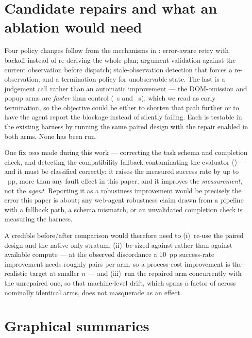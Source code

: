 \section{Candidate repairs and what an ablation would need}
\label{app:repair}

Four policy changes follow from the mechanisms in : error-aware
retry with backoff instead of re-deriving the whole plan; argument validation
against the current observation before dispatch; stale-observation detection that
forces a re-observation; and a termination policy for unobservable state. The last
is a judgement call rather than an automatic improvement --- the DOM-omission and
popup arms are \emph{faster} than control (\BehWebDomMissingTimeDelta{}~s and
\BehWebPopupBlockTimeDelta{}~s), which we read as early termination, so the
objective could be either to shorten that path further or to have the agent report
the blockage instead of silently failing. Each is testable in the existing harness
by running the same paired design with the repair enabled in both arms. None has
been run.

One fix \emph{was} made during this work --- correcting the task schema and
completion check, and detecting the compatibility fallback contaminating the
evaluator () --- and it must be classified correctly: it
raises the measured success rate by up to \BaselineSwing{}~pp, more than any fault
effect in this paper, and it improves the \emph{measurement}, not the \emph{agent}.
Reporting it as a robustness improvement would be precisely the error this paper is
about; any web-agent robustness claim drawn from a pipeline with a fallback path, a
schema mismatch, or an unvalidated completion check is measuring the harness.

A credible before/after comparison would therefore need to (i)~re-use the paired
design and the native-only stratum, (ii)~be sized against 
rather than against available compute --- at the observed discordance a $10$~pp
success-rate improvement needs roughly \PairsForTenPPObserved{} pairs per arm, so a
process-cost improvement is the realistic target at smaller $n$ --- and (iii)~run
the repaired arm concurrently with the unrepaired one, so that machine-level drift,
which spans a factor of \NoiseFloorRatio{} across nominally identical arms, does
not masquerade as an effect.

\section{Graphical summaries}
\label{app:figs}

